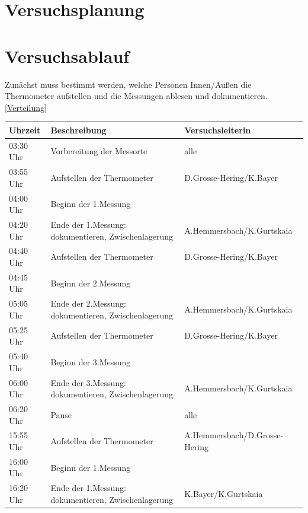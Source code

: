 \documentclass[ ngerman, fontsize= 12pt, paper=a4, headings=big, titlepage=true]{article}
\begin{document}
	\section{Versuchsplanung}
	
	\newpage
	\section{Versuchsablauf}
	Zunächst muss bestimmt werden, welche Personen Innen/Außen die Thermometer aufstellen und die Messungen ablesen und dokumentieren. \ref{Verteilung}
	\begin{table}[h]
		\begin{tabular}{l|l|l}
			
			Uhrzeit		&	Beschreibung									&	Versuchsleiterin \\
			\hline
			03:30 Uhr	&	Vorbereitung der Messorte						& alle\\
			03:55 Uhr	&	Aufstellen der Thermometer						& D.Grosse-Hering/K.Bayer\\
			04:00 Uhr	&	Beginn der 1.Messung							& \\
			04:20 Uhr	& 	Ende der 1.Messung: dokumentieren, Zwischenlagerung & A.Hemmersbach/K.Gurtskaia\\
			
			04:40 Uhr	&	Aufstellen der Thermometer						&D.Grosse-Hering/K.Bayer\\
			04:45 Uhr	&	Beginn der 2.Messung							& \\
			05:05 Uhr	& 	Ende der 2.Messung: dokumentieren, Zwischenlagerung & A.Hemmersbach/K.Gurtskaia\\
			
			05:25 Uhr	&	Aufstellen der Thermometer						&D.Grosse-Hering/K.Bayer\\
			05:40 Uhr	&	Beginn der 3.Messung							& \\
			06:00 Uhr	& 	Ende der 3.Messung: dokumentieren, Zwischenlagerung & A.Hemmersbach/K.Gurtskaia\\
			
			\hline
			06:20 Uhr	& 	Pause											& alle \\
			\hline
			
			15:55 Uhr	&	Aufstellen der Thermometer						&A.Hemmersbach/D.Grosse-Hering\\
			16:00 Uhr	&	Beginn der 1.Messung							& \\
			16:20 Uhr	& 	Ende der 1.Messung: dokumentieren, Zwischenlagerung &K.Bayer/K.Gurtskaia \\
			

\end{tabular}
\end{table}
\end{document}
